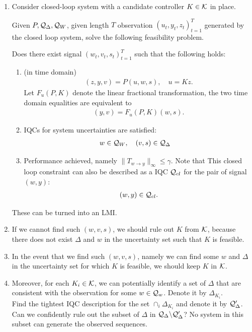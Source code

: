 \documentclass[11pt, onecolumn]{article}
\begin{document}
\begin{enumerate}
\item

Consider closed-loop system with a candidate controller $K\in\mathcal K$ in place.

Given $P, \mathcal Q_{\Delta}, \mathcal Q_{W}$, given length $T$ observation $(u_t, y_t, z_t)_{t=1}^{T}$
generated by the closed loop system, solve the following feasibility problem.

Does there exist signal $(w_t, v_t, s_t)_{t=1}^{T}$ such that the following holds:
\begin{enumerate}
\item {(in time domain)}
  \begin{align*} (z,y,v) = P (u,w,s), \quad u = K z.
  \end{align*}
  Let $F_u(P,K)$ denote the linear fractional transformation, the two time domain equalities are
  equivalent to
  \begin{align*} (y,v) = F_u(P,K) (w,s).
  \end{align*}

\item IQCs for system  uncertainties are satisfied:
  \begin{align*} & w\in\mathcal Q_W, \quad (v,s) \in \mathcal Q_{\Delta}
  \end{align*}

\item Performance achieved, namely $\|T_{w\to y}\|_{\infty} \le \gamma$. Note that This closed loop
  constraint can also be described as a IQC $\mathcal Q_{cl}$ for the pair of signal $(w,y)$:
  \begin{align*}
    (w,y) \in \mathcal Q_{cl}.
  \end{align*}

\end{enumerate}
These can be turned into an LMI.


\item If we cannot find such $(w,v,s)$, we should rule out $K$ from $\mathcal K$, because there does not
  exist $\Delta$ and $w$ in the uncertainty set such that $K$ is feasible.

\item In the event that we find such $(w,v,s)$, namely we can find some $w$ and  $\Delta$ in the
  uncertainty set for which $K$ is feasible, we should keep $K$ in $\mathcal K$.

\item Moreover, for each $K_i\in\mathcal K$, we can potentially identify a set of $\Delta$ that are
  consistent with the observation for some $w\in\mathcal Q_{w}$. Denote it by $\Delta_{K_i}$.
  \\
  Find the tightest IQC description for the set $\cap_i \Delta_{K_i}$ and denote it by $\mathcal
  Q_{\Delta}'$.  Can we confidently rule out the subset of $\Delta$ in $\mathcal Q_{\Delta} \backslash
  \mathcal Q_{\Delta}'$?  No system in this subset can generate the observed sequences.

\end{enumerate}
\end{document}
